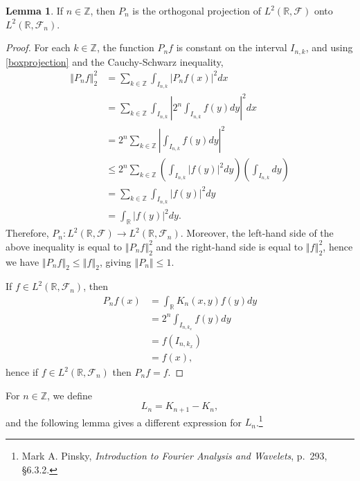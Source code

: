 \documentclass{article}
\newcommand{\norm}[1]{\left\Vert #1 \right\Vert}
\theoremstyle{definition}
\newtheorem{lemma}[theorem]{Lemma}
\theoremstyle{definition}
\begin{document}
\begin{lemma}
If $n \in \mathbb{Z}$, then $P_n$ is the orthogonal projection of $L^2(\mathbb{R},\mathscr{F})$ onto $L^2(\mathbb{R},\mathscr{F}_n)$.
\end{lemma}
\begin{proof}
For each $k \in \mathbb{Z}$, the function
$P_n f$ is constant on the interval $I_{n,k}$, and using \eqref{boxprojection} and the Cauchy-Schwarz inequality,
\begin{align*}
\norm{P_nf}_2^2&=\sum_{k \in \mathbb{Z}} \int_{I_{n,k}} |P_nf(x)|^2 dx\\
&=\sum_{k \in \mathbb{Z}} \int_{I_{n,k}} \left| 2^n \int_{I_{n,k}} f(y) dy \right|^2 dx\\
&= 2^n \sum_{k \in \mathbb{Z}} \left| \int_{I_{n,k}} f(y) dy \right|^2\\
&\leq 2^n \sum_{k \in \mathbb{Z}} \left( \int_{I_{n,k}} |f(y)|^2 dy \right) \left( \int_{I_{n,k}} dy\right)\\
&=\sum_{k \in \mathbb{Z}} \int_{I_{n,k}} |f(y)|^2 dy\\
&=\int_{\mathbb{R}} |f(y)|^2 dy.
\end{align*}
Therefore, $P_n:L^2(\mathbb{R},\mathscr{F}) \to L^2(\mathbb{R},\mathscr{F}_n)$. 
Moreover, the left-hand side of the above inequality is equal to $\norm{P_n f}_2^2$ and the right-hand side is
equal to $\norm{f}_2^2$, hence we have
$\norm{P_n f}_2 \leq \norm{f}_2$, giving $\norm{P_n} \leq 1$.


If $f \in L^2(\mathbb{R},\mathscr{F}_n)$, then
\begin{align*}
P_n f(x)&= \int_{\mathbb{R}} K_n(x,y) f(y) dy\\
&=2^n \int_{I_{n,k_x}} f(y) dy\\
&=f(I_{n,k_x})\\
&=f(x),
\end{align*}
hence if $f \in L^2(\mathbb{R},\mathscr{F}_n)$ then $P_n f=f$.
\end{proof}

For $n \in \mathbb{Z}$, we define
\[
L_n = K_{n+1}-K_n,
\]
and the following lemma gives a different expression for $L_n$.\footnote{Mark A. Pinsky, {\em Introduction to
Fourier Analysis and Wavelets}, p.~293, \S 6.3.2.}
\end{document}
